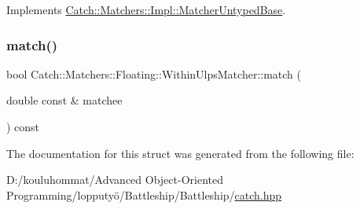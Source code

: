 Implements \mbox{\hyperlink{class_catch_1_1_matchers_1_1_impl_1_1_matcher_untyped_base_a91d3a907dbfcbb596077df24f6e11fe2}{Catch\+::\+Matchers\+::\+Impl\+::\+Matcher\+Untyped\+Base}}.

\mbox{\label{struct_catch_1_1_matchers_1_1_floating_1_1_within_ulps_matcher_aabda42a0dc5d00f3c5916feb75006b32}} 
\subsubsection{\texorpdfstring{match()}{match()}}
{\footnotesize\ttfamily bool Catch\+::\+Matchers\+::\+Floating\+::\+Within\+Ulps\+Matcher\+::match (\begin{DoxyParamCaption}\item[{double const \&}]{matchee }\end{DoxyParamCaption}) const\hspace{0.3cm}{\ttfamily [override]}}



The documentation for this struct was generated from the following file\+:\begin{DoxyCompactItemize}
\item 
D\+:/kouluhommat/\+Advanced Object-\/\+Oriented Programming/lopputyö/\+Battleship/\+Battleship/\mbox{\hyperlink{catch_8hpp}{catch.\+hpp}}\end{DoxyCompactItemize}
